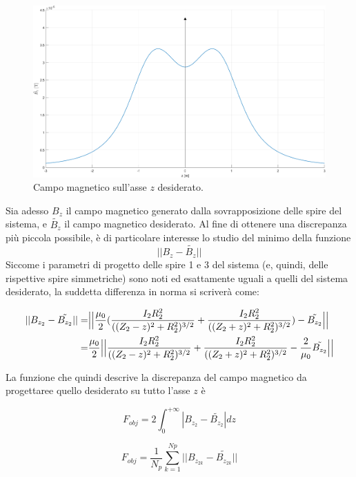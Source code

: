 \documentclass[a4paper, 11pt]{article}
\begin{document}
\begin{figure}[H]
    \centering
    \includegraphics[width=16cm]{assets/figure2}
    \caption{Campo magnetico sull'asse $z$ desiderato.}
\end{figure}
\noindent
Sia adesso $B_{z}$ il campo magnetico generato dalla sovrapposizione delle spire
del sistema, e $\tilde{B_{z}}$ il campo magnetico desiderato. Al fine di
ottenere una discrepanza più piccola possibile, è di particolare interesse lo
studio del minimo della funzione
\[||B_{z}-\tilde{B_{z}}||\] Siccome i parametri di progetto delle spire 1 e 3
del sistema (e, quindi, delle rispettive spire simmetriche) sono noti ed
esattamente uguali a quelli del sistema desiderato, la suddetta differenza in
norma si scriverà come:

\begin{equation}
    \begin{split}
        ||B_{z_{2}}-\tilde{B_{z_{2}}}||
        =& \Bigl|\Bigl|\frac{\mu_{0}}{2}(\frac{I_{2}R_{2}^{2}}{((Z_{2}-z)^{2}+R_{2}^{2})^{3/2}}+\frac{I_{2}R_{2}^{2}}{((Z_{2}+z)^{2}+R_{2}^{2})^{3/2}})-\tilde{B_{z_{2}}}\Bigr|\Bigr| \\
        =& \frac{\mu_{0}}{2}\Bigl|\Bigl|\frac{I_{2}R_{2}^{2}}{((Z_{2}-z)^{2}+R_{2}^{2})^{3/2}}+\frac{I_{2}R_{2}^{2}}{((Z_{2}+z)^{2}+R_{2}^{2})^{3/2}}-\frac{2}{\mu_{0}}\tilde{B_{z_{2}}}\Bigr|\Bigr|
    \end{split} 
\end{equation}

\noindent
La funzione che quindi descrive la discrepanza del campo magnetico da
progettaree quello desiderato su tutto l'asse $z$ è 

\[F_{obj}=2\int_{0}^{+\infty}|B_{z_{2}}-\tilde{B_{z_{2}}}|dz\]

\[F_{obj}=\frac{1}{N_{p}}\sum\limits_{k=1}^{Np}
||B_{z_{2k}}-\tilde{B_{z_{2k}}}||\]
\end{document}
